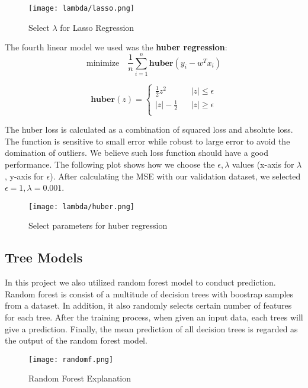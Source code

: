 \documentclass[fleqn,10pt]{SelfArx} %
\begin{document}
\begin{figure}[ht]\centering %
\texttt{[image: lambda/lasso.png]}
\caption{Select $\lambda$ for Lasso Regression}
\label{fig:view}
\end{figure}

\noindent
The fourth linear model we used was the \textbf{huber regression}:
$$ \text{minimize} \quad \frac{1}{n}\sum_{i=1}^{n} \textbf{huber}(y_i - w^Tx_i)$$

$$
\textbf{huber}(z) = \left\{
\begin{array}{rcl}
\frac{1}{2}z^2 && |z| \le \epsilon \\
|z| - \frac{1}{2} && |z| \ge \epsilon \\ 
\end{array}
\right.
$$

\noindent
The huber loss is calculated as a combination of squared loss and absolute loss. The function is sensitive to small error while robust to large error to avoid the domination of outliers. We believe such loss function should have a good performance. The following plot shows how we choose the $\epsilon, \lambda$ values (x-axis for $\lambda$, y-axis for $\epsilon$). After calculating the MSE with our validation dataset, we selected $\epsilon = 1, \lambda = 0.001$.

\begin{figure}[ht]\centering %
\texttt{[image: lambda/huber.png]}
\caption{Select parameters for huber regression}
\label{fig:view}
\end{figure}

\subsection{Tree Models}
\noindent
In this project we also utilized random forest model to conduct prediction. Random forest is consist of a multitude of decision trees with boostrap samples from a dataset. In addition, it also randomly selects certain number of features for each tree. After the training process, when given an input data, each trees will give a prediction. Finally, the mean prediction of all decision trees is regarded as the output of the random forest model. \\

\begin{figure}[ht]\centering %
\texttt{[image: randomf.png]}
\caption{Random Forest Explanation \cite{ref4}}
\label{fig:view}
\end{figure}
\end{document}
